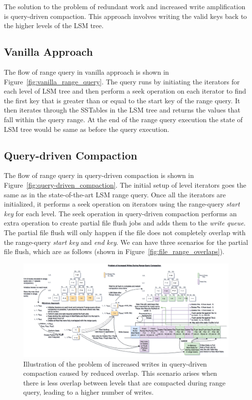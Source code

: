 The solution to the problem of redundant work and increased write amplification is query-driven compaction. This 
approach involves writing the valid keys back to the higher levels of the LSM tree.

\subsection{Vanilla Approach}
The flow of range query in vanilla approach is shown in Figure~\ref{fig:vanilla_range_query}. The query runs by 
initiating the iterators for each level of LSM tree and then perform a seek operation on each iterator to find the 
first key that is greater than or equal to the start key of the range query. It then iterates through the
SSTables in the LSM tree and returns the values that fall within the query range. At the end of the range query
execution the state of LSM tree would be same as before the query execution.

\subsection{Query-driven Compaction}
The flow of range query in query-driven compaction is shown in Figure~\ref{fig:query-driven_compaction}. The initial 
setup of level iterators goes the same as in the state-of-the-art LSM range query. Once all the iterators are 
initialized, it performs a seek operation on iterators using the range-query \textit{start key} for each level. The seek 
operation in query-driven compaction performs an extra operation to create partial file flush jobs and adds them to the 
\textit{write queue}. The partial file flush will only happen if the file does not completely overlap with the range-query 
\textit{start key} and \textit{end key}. We can have three scenarios for the partial file flush, which 
are as follows (shown in Figure~\ref{fig:file_range_overlaps}).

\begin{figure}
    \includegraphics[scale=0.12]{Figures/RQ-driven problem of increased writes.png}
    \caption{Illustration of the problem of increased writes in query-driven compaction caused by reduced overlap. This scenario arises when there is less overlap between levels that are compacted during range query, leading to a higher number of writes.}\label{fig:query-driven_compaction_with_increased_writes}
\end{figure}

